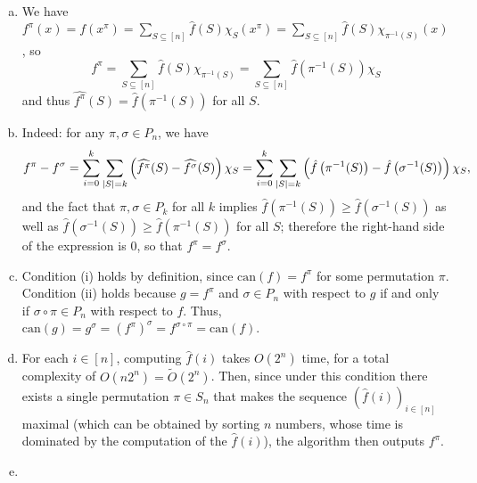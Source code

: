 \documentclass[12pt]{article}
\newcommand{\eqn}[1]{\begin{equation*}#1\end{equation*}}
\newcommand{\sumS}{\sum_{S \subseteq [n]}}
\begin{document}
\subsection{}
\begin{enumerate}[(a)]
    \item We have $f^\pi(x) = f(x^\pi) = \sumS \hat{f}(S) \chi_S(x^\pi) = \sumS \hat{f}(S) \chi_{\pi^{-1}(S)}(x)$, so
    \eqn{f^\pi = \sumS \hat{f}(S) \chi_{\pi^{-1}(S)} = \sumS \hat{f}\left(\pi^{-1}(S)\right) \chi_S}
    and thus $\widehat{f^\pi}(S) = \hat{f}(\pi^{-1}(S))$ for all $S$.
    
    \item Indeed: for any $\pi, \sigma \in P_n$, we have
    \eqn{f^\pi - f^\sigma = \sum_{i = 0}^k \sum_{\abs{S} = k} \left(\widehat{f^\pi}(S) - \widehat{f^\sigma}(S)\right)\chi_S = \sum_{i = 0}^k \sum_{\abs{S} = k} \left(\hat{f}\left(\pi^{-1}(S)\right) - \hat{f}\left(\sigma^{-1}(S)\right)\right)\chi_S,}
    and the fact that $\pi, \sigma \in P_k$ for all $k$ implies $\hat{f}\left(\pi^{-1}(S)\right) \geq \hat{f}\left(\sigma^{-1}(S)\right)$ as well as $\hat{f}\left(\sigma^{-1}(S)\right) \geq \hat{f}\left(\pi^{-1}(S)\right)$ for all $S$; therefore the right-hand side of the expression is 0, so that $f^\pi = f^\sigma$.
    
    \item Condition (i) holds by definition, since $\text{can}(f) = f^\pi$ for some permutation $\pi$. Condition (ii) holds because $g = f^\pi$ and $\sigma \in P_n$ with respect to $g$ if and only if $\sigma \circ \pi \in P_n$ with respect to $f$. Thus, $\text{can}(g) = g^\sigma = \left(f^\pi\right)^\sigma = f^{\sigma \circ \pi} = \text{can}(f)$.
    
    \item For each $i \in [n]$, computing $\hat{f}(i)$ takes $O(2^n)$ time, for a total complexity of $O(n 2^n) = \tilde{O}(2^n)$. Then, since under this condition there exists a single permutation $\pi \in S_n$ that makes the sequence $\left(\hat{f}(i)\right)_{i \in [n]}$ maximal (which can be obtained by sorting $n$ numbers, whose time is dominated by the computation of the $\hat{f}(i)$), the algorithm then outputs $f^\pi$.
    
    \item
\end{enumerate}

\subsection{}
\end{document}
